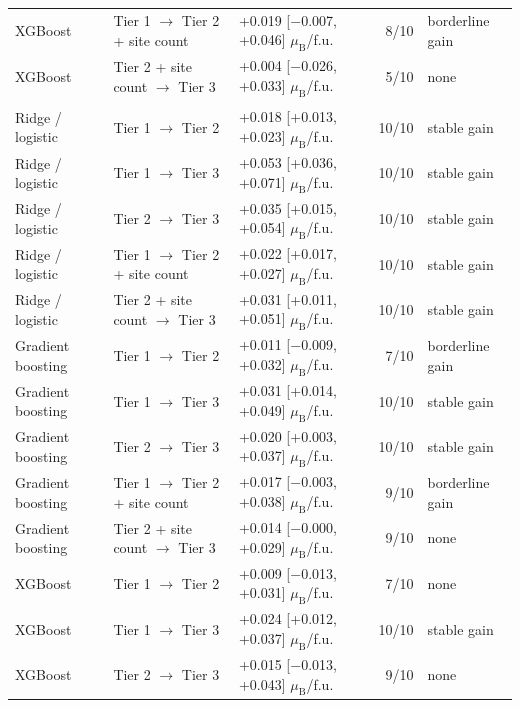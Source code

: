 \begin{table}
\begin{tabularx}{\textwidth}{@{}>{\raggedright\arraybackslash}Xllrl@{}}
\quad XGBoost & Tier 1 $\rightarrow$ Tier 2 + site count & +0.019 [$-$0.007, +0.046] $\mu_\mathrm{B}$/f.u. & 8/10 & borderline gain \\
\quad XGBoost & Tier 2 + site count $\rightarrow$ Tier 3 & +0.004 [$-$0.026, +0.033] $\mu_\mathrm{B}$/f.u. & 5/10 & none \\
\addlinespace
\multicolumn{5}{@{}l@{}}{\textit{per formula unit, m>0 only}} \\
\quad Ridge / logistic & Tier 1 $\rightarrow$ Tier 2 & +0.018 [+0.013, +0.023] $\mu_\mathrm{B}$/f.u. & 10/10 & stable gain \\
\quad Ridge / logistic & Tier 1 $\rightarrow$ Tier 3 & +0.053 [+0.036, +0.071] $\mu_\mathrm{B}$/f.u. & 10/10 & stable gain \\
\quad Ridge / logistic & Tier 2 $\rightarrow$ Tier 3 & +0.035 [+0.015, +0.054] $\mu_\mathrm{B}$/f.u. & 10/10 & stable gain \\
\quad Ridge / logistic & Tier 1 $\rightarrow$ Tier 2 + site count & +0.022 [+0.017, +0.027] $\mu_\mathrm{B}$/f.u. & 10/10 & stable gain \\
\quad Ridge / logistic & Tier 2 + site count $\rightarrow$ Tier 3 & +0.031 [+0.011, +0.051] $\mu_\mathrm{B}$/f.u. & 10/10 & stable gain \\
\quad Gradient boosting & Tier 1 $\rightarrow$ Tier 2 & +0.011 [$-$0.009, +0.032] $\mu_\mathrm{B}$/f.u. & 7/10 & borderline gain \\
\quad Gradient boosting & Tier 1 $\rightarrow$ Tier 3 & +0.031 [+0.014, +0.049] $\mu_\mathrm{B}$/f.u. & 10/10 & stable gain \\
\quad Gradient boosting & Tier 2 $\rightarrow$ Tier 3 & +0.020 [+0.003, +0.037] $\mu_\mathrm{B}$/f.u. & 10/10 & stable gain \\
\quad Gradient boosting & Tier 1 $\rightarrow$ Tier 2 + site count & +0.017 [$-$0.003, +0.038] $\mu_\mathrm{B}$/f.u. & 9/10 & borderline gain \\
\quad Gradient boosting & Tier 2 + site count $\rightarrow$ Tier 3 & +0.014 [$-$0.000, +0.029] $\mu_\mathrm{B}$/f.u. & 9/10 & none \\
\quad XGBoost & Tier 1 $\rightarrow$ Tier 2 & +0.009 [$-$0.013, +0.031] $\mu_\mathrm{B}$/f.u. & 7/10 & none \\
\quad XGBoost & Tier 1 $\rightarrow$ Tier 3 & +0.024 [+0.012, +0.037] $\mu_\mathrm{B}$/f.u. & 10/10 & stable gain \\
\quad XGBoost & Tier 2 $\rightarrow$ Tier 3 & +0.015 [$-$0.013, +0.043] $\mu_\mathrm{B}$/f.u. & 9/10 & none \\

\end{tabularx}
\end{table}
